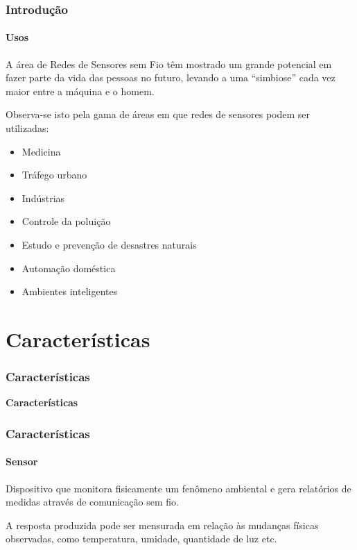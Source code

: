 \documentclass[notes]{beamer}
\begin{document}
\begin{frame}
\label{slide_9}
\frametitle{Introdução}
\framesubtitle{Usos}

\begin{block}

A área de Redes de Sensores sem Fio têm mostrado um grande potencial em fazer parte da vida das pessoas no futuro, levando a uma “simbiose” cada vez maior entre a máquina e o homem\cite{Redes_Sensores}. 

\end{block} \pause

\begin{block}

Observa-se isto pela gama de áreas em que redes de sensores podem ser utilizadas: \pause

\begin{itemize}

\item Medicina \pause
\item Tráfego urbano \pause
\item Indústrias \pause
\item Controle da poluição \pause
\item Estudo e prevenção de desastres naturais \pause
\item Automação doméstica \pause
\item Ambientes inteligentes 

\end{itemize}

\end{block}

\end{frame}

\section{Características}
\begin{frame}
\label{slide_10}
\frametitle{Características}

\begin{block}

 \center \textbf{Características}
 
\end{block}

\end{frame}

\begin{frame}
\label{slide_11}
\frametitle{Características}
\framesubtitle{Sensor}

\begin{block}

Dispositivo que monitora fisicamente um fenômeno ambiental e gera
relatórios de medidas através de comunicação sem
fio\cite{Clicia}.
\end{block}

\begin{block}

A resposta produzida pode ser mensurada em relação às mudanças físicas observadas, como temperatura, umidade, quantidade de luz etc.
\end{block}

\end{frame}
\end{document}
